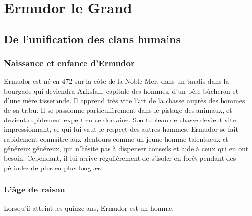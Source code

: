 
\section{Ermudor le Grand}
\subsection{De l'unification des clans humains}
\subsubsection{Naissance et enfance d'Ermudor}
Ermudor est né en 472 sur la côte de la Noble Mer, dans un taudis dans la bourgade qui deviendra Anksfall, capitale des hommes, d'un père bûcheron et d'une mère tisserande. Il apprend très vite l'art de la chasse auprès des hommes de sa tribu. Il se passionne particulièrement dans le pistage des animaux, et devient rapidement expert en ce domaine. Son tableau de chasse devient vite impressionnant, ce qui lui vaut le respect des autres hommes. Ermudor se fait rapidement connaître aux alentours comme un jeune homme talentueux et généreux généreux, qui n'hésite pas à dispenser conseils et aide à ceux qui en ont besoin. Cependant, il lui arrive régulièrement de s'isoler en forêt pendant des périodes de plus en plus longues.
\subsubsection{L'âge de raison}
Lorsqu'il atteint les quinze ans, Ermudor est un homme. 